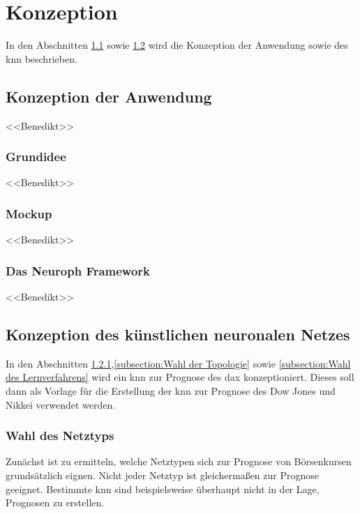 \chapter{Konzeption}
\label{chapter:Konzeption}

In den Abschnitten \ref{section:Konzeption der Anwendung} sowie \ref{section:Konzeption des künstlichen neuronalen Netzes} wird die Konzeption der Anwendung sowie  des \acs{knn} beschrieben.

\section{Konzeption der Anwendung} %
\label{section:Konzeption der Anwendung} %
<<Benedikt>>
\Blindtext

\subsection{Grundidee} %
\label{subsection:Grundidee} %
<<Benedikt>>
\Blindtext

\subsection{Mockup} %
\label{subsection:Mockup} %
<<Benedikt>>
\Blindtext

\subsection{Das Neuroph Framework} %
\label{subsection:Das Neuroph Framework} %
<<Benedikt>>
\Blindtext

\section{Konzeption des künstlichen neuronalen Netzes}
\label{section:Konzeption des künstlichen neuronalen Netzes}

In den Abschnitten \ref{subsection:Wahl des Netztyps},\ref{subsection:Wahl der Topologie} sowie \ref{subsection:Wahl des Lernverfahrens} wird ein \acs{knn} zur Prognose des \acs{dax} konzeptioniert. Dieses soll dann  als Vorlage für die Erstellung der \acs{knn} zur Prognose des Dow Jones und Nikkei verwendet werden.

\subsection{Wahl des Netztyps}
\label{subsection:Wahl des Netztyps}
Zunächst ist zu ermitteln, welche Netztypen sich zur Prognose von Börsenkursen grundsätzlich eignen. Nicht jeder Netztyp ist gleichermaßen zur Prognose geeignet. Bestimmte \acs{knn} sind beispielsweise überhaupt nicht in der Lage, Prognosen zu erstellen. 

